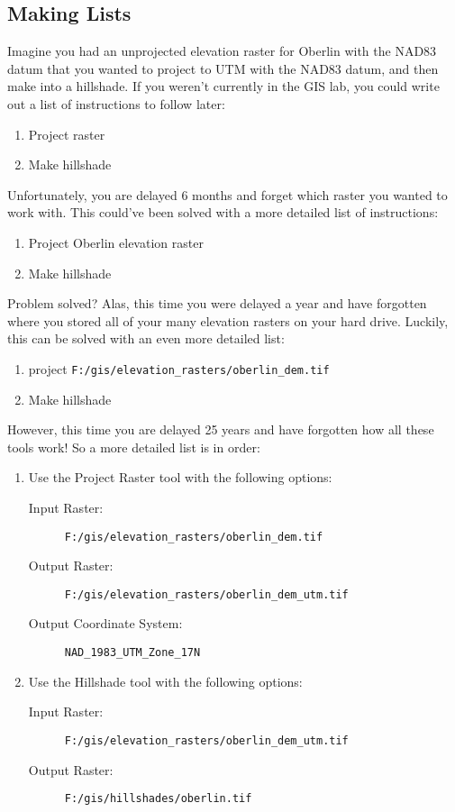 \documentclass{article}
\begin{document}
\subsection{Making Lists}
Imagine you had an unprojected elevation raster for Oberlin with the NAD83  datum that you wanted to project to UTM with the NAD83 datum, and then make into a hillshade.  If you weren't currently in the GIS lab, you could write out a list of instructions to follow later:
\begin{enumerate}
    \item Project raster
    \item Make hillshade
\end{enumerate}
Unfortunately, you are delayed 6 months and forget which raster you wanted to work with.  This could've been solved with a more detailed list of instructions:
\begin{enumerate}
    \item Project Oberlin elevation raster
    \item Make hillshade
\end{enumerate}
Problem solved?  Alas, this time you were delayed a year and have forgotten where you stored all of your many elevation rasters on your hard drive.  Luckily, this can be solved with an even more detailed list:
\begin{enumerate}
    \item project \verb+F:/gis/elevation_rasters/oberlin_dem.tif+
    \item Make hillshade
\end{enumerate}
However, this time you are delayed 25 years and have forgotten how all these tools work!  So a more detailed list is in order:
\begin{enumerate}
    \item Use the Project Raster tool with the following options: 
          \begin{description}
              \item [Input Raster:] \verb+F:/gis/elevation_rasters/oberlin_dem.tif+
              \item [Output Raster:] \verb+F:/gis/elevation_rasters/oberlin_dem_utm.tif+
              \item [Output Coordinate System:] \verb+NAD_1983_UTM_Zone_17N+
          \end{description}
      \item Use the Hillshade tool with the following options:
            \begin{description}
                \item [Input Raster:] \verb+F:/gis/elevation_rasters/oberlin_dem_utm.tif+
                \item [Output Raster:] \verb+F:/gis/hillshades/oberlin.tif+
            \end{description}
\end{enumerate}
\end{document}
